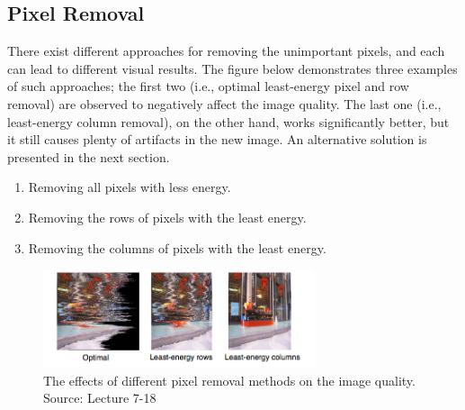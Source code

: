 \documentclass{article}
\begin{document}
\subsection{Pixel Removal}
There exist different approaches for removing the unimportant pixels, and each can lead to different visual results. The figure below demonstrates three examples of such approaches; the first two (i.e., optimal least-energy pixel and row removal) are observed to negatively affect the image quality. The last one (i.e., least-energy column removal), on the other hand, works significantly better, but it still causes plenty of artifacts in the new image. An alternative solution is presented in the next section.
\begin{enumerate}
\item Removing all pixels with less energy.
\item Removing the rows of pixels with the least energy.
\item Removing the columns of pixels with the least energy.
\end{enumerate}
\begin{figure}[H]
\centering
\hspace*{1.2cm}\includegraphics[width=8cm]{Pixel_Removal.png}
\caption{The effects of different pixel removal methods on the image quality. Source: Lecture 7-18}
\end{figure}
\end{document}

